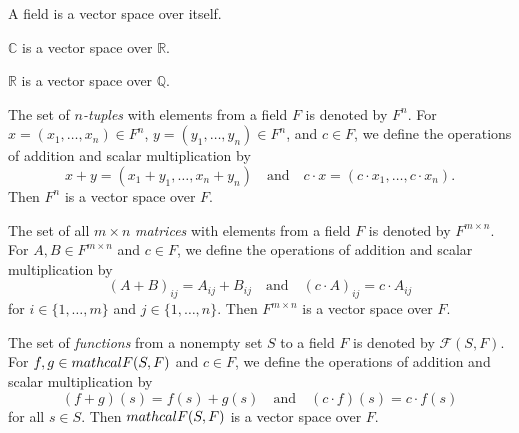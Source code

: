 \begin{example}
  A field is a vector space over itself.
\end{example}

\begin{example}
  $\mathbb{C}$ is a vector space over $\mathbb{R}$.
\end{example}

\begin{example}
  $\mathbb{R}$ is a vector space over $\mathbb{Q}$.
\end{example}

\begin{example}
  The set of \emph{$n$-tuples} with elements from a field $F$ is denoted by
  $F^n$.
  For $x = (x_1, \dots, x_n) \in F^n$, $y = (y_1, \dots, y_n) \in F^n$, and
  $c \in F$, we define the operations of addition and scalar multiplication by
  \begin{equation*}
    x + y = (x_1 + y_1, \dots, x_n + y_n)
    \quad \text{and} \quad
    c \cdot x = (c \cdot x_1, \dots, c \cdot x_n).
  \end{equation*}
  Then $F^n$ is a vector space over $F$.
\end{example}

\begin{example}
  The set of all $m \times n$ \emph{matrices} with elements from a field $F$ is
  denoted by $F^{m \times n}$.
  For $A, B \in F^{m \times n}$ and $c \in F$, we define the operations of
  addition and scalar multiplication by
  \begin{equation*}
    (A + B)_{ij} = A_{ij} + B_{ij}
    \quad \text{and} \quad
    (c \cdot A)_{ij} = c \cdot A_{ij}
  \end{equation*}
  for $i \in \{1, \dots, m\}$ and $j \in \{1, \dots, n\}$.
  Then $F^{m \times n}$ is a vector space over $F$.
\end{example}

\begin{example}
  The set of \emph{functions} from a nonempty set $S$ to a field $F$ is denoted
  by $\mathcal{F}(S, F)$.
  For $f, g \in \\mathcal{F}(S, F)$ and $c \in F$, we define the operations of
  addition and scalar multiplication by
  \begin{equation*}
    (f + g)(s) = f(s) + g(s)
    \quad \text{and} \quad
    (c \cdot f)(s) = c \cdot f(s)
  \end{equation*}
  for all $s \in S$.
  Then $\\mathcal{F}(S, F)$ is a vector space over $F$.
\end{example}

